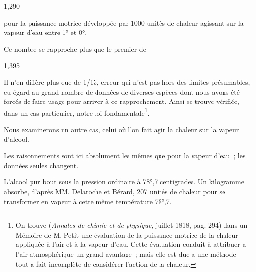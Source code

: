 \documentclass[french,twoside]{book} %
\begin{document}
\begin{center}
1,290\par
\end{center}

\noindent pour la puissance motrice développée par 1000 unités de chaleur agissant sur la vapeur d’eau entre 1° et 0°.\par
Ce nombre se rapproche plus que le premier de\par

\begin{center}
1,395\par
\end{center}

\noindent Il n’en diffère plus que de 1/13, erreur qui n’est pas hors des limites présumables, eu égard au grand nombre de données de diverses espèces dont nous avons été forcés de faire usage pour arriver à ce rapprochement. Ainsi se trouve vérifiée, dans un cas particulier, notre loi fondamentale\footnote{On trouve (\emph{Annales de chimie et de physique}, juillet 1818, pag. 294) dans un Mémoire de M. Petit une évaluation de la puissance motrice de la chaleur appliquée à l’air et à la vapeur d’eau. Cette évaluation conduit à attribuer a l’air atmosphérique un grand avantage ; mais elle est due a une méthode tout-à-fait incomplète de considérer l’action de la chaleur.}.\par
Nous examinerons un autre cas, celui où l’on fait agir la chaleur sur la vapeur d’alcool.\par
Les raisonnements sont ici absolument les mêmes que pour la vapeur d’eau ; les données seules changent.\par
L’alcool pur bout sous la pression ordinaire à 78°,7 centigrades. Un kilogramme absorbe, d’après MM. Delaroche et Bérard, 207 unités de chaleur pour se transformer en vapeur à cette même température 78°,7.\par
\end{document}
